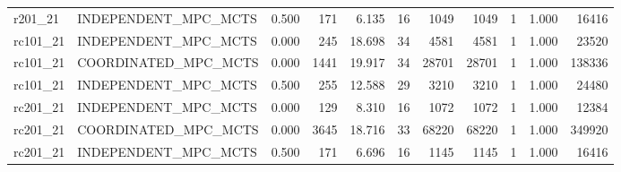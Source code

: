 \begin{tabular}{llrrrrrrrrr}
r201\_21 & INDEPENDENT\_MPC\_MCTS & 0.500 & 171 & 6.135 & 16 & 1049 & 1049 & 1 & 1.000 & 16416 \\
rc101\_21 & INDEPENDENT\_MPC\_MCTS & 0.000 & 245 & 18.698 & 34 & 4581 & 4581 & 1 & 1.000 & 23520 \\
rc101\_21 & COORDINATED\_MPC\_MCTS & 0.000 & 1441 & 19.917 & 34 & 28701 & 28701 & 1 & 1.000 & 138336 \\
rc101\_21 & INDEPENDENT\_MPC\_MCTS & 0.500 & 255 & 12.588 & 29 & 3210 & 3210 & 1 & 1.000 & 24480 \\
rc201\_21 & INDEPENDENT\_MPC\_MCTS & 0.000 & 129 & 8.310 & 16 & 1072 & 1072 & 1 & 1.000 & 12384 \\
rc201\_21 & COORDINATED\_MPC\_MCTS & 0.000 & 3645 & 18.716 & 33 & 68220 & 68220 & 1 & 1.000 & 349920 \\
rc201\_21 & INDEPENDENT\_MPC\_MCTS & 0.500 & 171 & 6.696 & 16 & 1145 & 1145 & 1 & 1.000 & 16416 \\
\bottomrule
\end{tabular}
